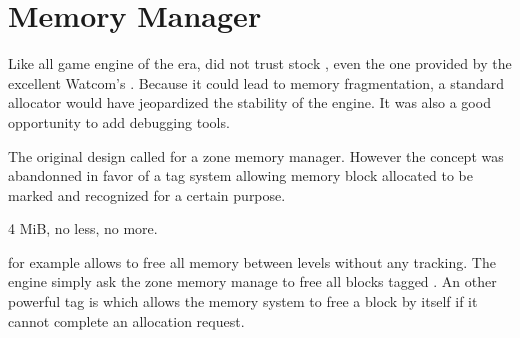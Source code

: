 \section{Memory Manager}
Like all game engine of the era, \doom did not trust stock , even the one provided by the excellent Watcom's . Because it could lead to memory fragmentation, a standard allocator would have jeopardized the stability of the engine. It was also a good opportunity to add debugging tools.\\
\par
The original design called for a zone memory manager. However the concept was abandonned in favor of a tag system allowing memory block allocated to be marked and recognized for a certain purpose.\\
\par
4 MiB, no less, no more.\\
\par
{}
\par
{} for example allows \doom to free all memory between levels without any tracking. The engine simply ask the zone memory manage to free all blocks tagged . An other powerful tag is  which allows the memory system to free a block by itself if it cannot complete an allocation request. \\
\par
  
\par
{}
\par
{}